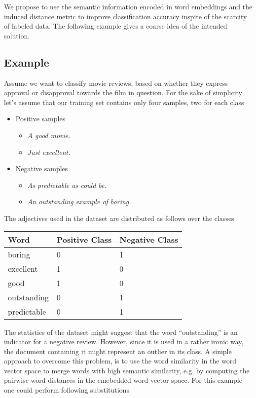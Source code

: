 We propose to use the semantic information encoded in word embeddings and the
induced distance metric to improve classification accuracy inspite of the scarcity of labeled
data. The following example gives a coarse idea of the intended solution.

\subsection{Example}
Assume we want to classify movie reviews, based on whether they
express approval or disapproval towards the film in question. For the sake of
simplicity let's assume that our training set contains only four samples, two
for each class

\begin{itemize}
  \item Positive samples
  \begin{itemize}
	  \item \emph{A good movie.}
	  \item \emph{Just excellent.}
  \end{itemize}
  
  \item Negative samples
  \begin{itemize}
	  \item \emph{As predictable as could be.}
	  \item \emph{An outstanding example of boring.} 
  \end{itemize}
\end{itemize}

The adjectives used in the dataset are distributed as follows over the classes

\begin{center}
\begin{tabular}{l|l|l}
\textbf{Word} & \textbf{Positive Class} & \textbf{Negative Class}  \\
\hline
boring & 0 & 1 \\
excellent & 1 & 0 \\
good & 1 & 0 \\
outstanding & 0 & 1 \\
predictable & 0 & 1 \\

\end{tabular}
\end{center}

The statistics of the dataset might suggest that the word ``outstanding'' is an
indicator for a negative review. However, since it is used in a rather ironic
way, the document containing it might represent an outlier in its class. A
simple approach to overcome this problem, is to use the word similarity
in the word vector space to merge words with high semantic similarity, e.g. by
computing the pairwise word distances in the emebedded word vector space.
For this example one could perform following substitutions

